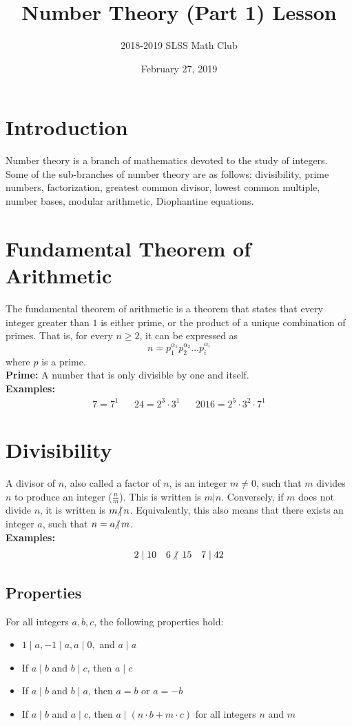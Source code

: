 \documentclass[12pt]{article}
\title{Number Theory (Part 1) Lesson\vspace{-3mm}}
\author{2018-2019 SLSS Math Club\vspace{-5mm}}
\date{February 27, 2019\vspace{-5mm}}
\newcommand{\ndiv}{\hspace{-4pt}\not|\hspace{2pt}}
\begin{document}
\maketitle

\section{Introduction}
Number theory is a branch of mathematics devoted to the study of integers. Some of the sub-branches of number theory are as follows: divisibility, prime numbers, factorization, greatest common divisor, lowest common multiple, number bases, modular arithmetic, Diophantine equations.

\section{Fundamental Theorem of Arithmetic}
The fundamental theorem of arithmetic is a theorem that states that every integer greater than $1$ is either prime, or the product of a unique combination of primes. That is, for every $n \geq 2$, it can be expressed as $$n = p_1^{\alpha_1}p_2^{\alpha_2}\dots p_i^{\alpha_i}$$ where $p$ is a prime. \\

\textbf{Prime:} A number that is only divisible by one and itself. \\

\textbf{Examples:}
\begin{align*}
    7 = 7^1  && 24 = 2^3 \cdot 3^1 && 2016 = 2^5 \cdot 3^2 \cdot 7^1 
\end{align*}

\section{Divisibility}
A divisor of $n$, also called a factor of $n$, is an integer $m \neq 0$, such that $m$ divides $n$ to produce an integer ($\frac{n}{m}$). This is written is $m | n$. Conversely, if $m$ does not divide $n$, it is written is $m \ndiv n$. Equivalently, this also means that there exists an integer $a$, such that $n = a \ndiv m$. \\

\textbf{Examples:}
\begin{align*}
    2\; | \; 10 && 6\; \ndiv \; 15 && 7 \; | \; 42
\end{align*}

\subsection{Properties}
For all integers $a, b, c$, the following properties hold: 
\begin{itemize}
    \item $1 \; | \; a, -1 \; | \; a, a \; | \; 0,$ and $a \; | \; a$
    \item If $a \; | \; b$ and $b \; | \; c$, then $a \; | \; c$
    \item If $a \; | \; b$ and $b  \; | \; a$, then $a = b$ or $a = -b$
    \item If $a \; | \; b$ and $a \; | \; c$, then $a  \; | \; (n \cdot b + m \cdot c)$ for all integers $n$ and $m$
\end{itemize}
\end{document}
